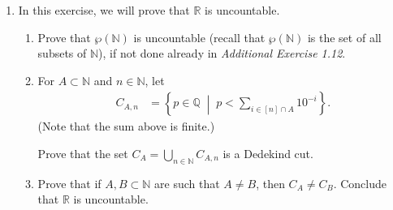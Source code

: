 \documentclass[11pt]{article}
\newcommand{\bbN}{\mathbb{N}}
\newcommand{\bbQ}{\mathbb{Q}}
\newcommand{\bbR}{\mathbb{R}}
\theoremstyle{definition}
\numberwithin{equation}{subsection}
\begin{document}
\begin{enumerate}
\begin{enumerate}
\begin{proof}
If $\frac{1}{n}$ is not a dyadic rational, then $a<a+\frac{1}{n}<b$, where $a+\frac{1}{n}$ is not a dyadic rational, and we are done. If $\frac{1}{n}$ is a dyadic rational, then we have that $0<\frac{1}{n+1}<\frac{1}{n}<b-a$, hence $a<a+\frac{1}{n+1}<b$, where $a+\frac{1}{n+1}$ is not a dyadic rational, and we are done. 

{\em More generally, let $y \in \partial X$. It is possible that $y \in X, y \notin LP(X), y \notin \bbR \setminus X, y \in LP(\bbR \setminus X)$. Then, $y \notin \overline{X} \setminus X$. Hence, it is not true that $\partial X\subset \overline{X}\setminus X$.}

\renewcommand\qedsymbol{QED}
\end{proof}
\item Can $\partial X$ be dense in $\bbR$?
\begin{proof}
Yes. Let $X$ be the set of dyadic rationals. Then, $\partial X = \bbR \cap \overline{(\bbR \setminus X)}$. We know that $\bbR \setminus X \subset \overline{(\bbR \setminus X)}$, hence it suffices to show that $\bbR \setminus X$ is dense in $\bbR$. 

Replicating the proof for part c) without the condition that the region contains a dyadic rational $j$, we have showed that any time you have two real numbers $a<b$, there exists $m \in \bbR \setminus X$ such that $a<m<b$. 

\renewcommand\qedsymbol{QED}
\end{proof}
\end{enumerate}

	

	
\item In this exercise, we will prove that $\bbR$ is uncountable.
  \begin{enumerate}
  \item Prove that $\wp(\bbN)$ is uncountable (recall that $\wp(\bbN)$ is the set of all subsets of $\bbN$), if not done already in {\em Additional Exercise 1.12}.
  \item For $A\subset\bbN$ and $n\in\bbN$, let
    \begin{align*}
      C_{A,n}
      & =
      \left\{p\in\bbQ\;\middle\vert\; p < \sum_{i\in[n]\cap A} 10^{-i}\right\}.
    \end{align*}
    (Note that the sum above is finite.)

    Prove that the set $C_A=\bigcup_{n\in\bbN} C_{A,n}$ is a Dedekind cut.
  \item Prove that if $A,B\subset\bbN$ are such that $A\neq B$, then $C_A\neq C_B$. Conclude that
    $\bbR$ is uncountable.


\end{enumerate}
\end{enumerate}
\end{document}
